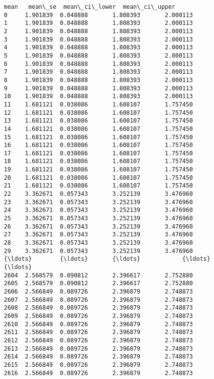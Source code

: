 \documentclass[11pt]{article}
\begin{document}
    \begin{Verbatim}[commandchars=\\\{\}]
          mean   mean\_se  mean\_ci\_lower  mean\_ci\_upper
0     1.901839  0.048888       1.808393       2.000113
1     1.901839  0.048888       1.808393       2.000113
2     1.901839  0.048888       1.808393       2.000113
3     1.901839  0.048888       1.808393       2.000113
4     1.901839  0.048888       1.808393       2.000113
5     1.901839  0.048888       1.808393       2.000113
6     1.901839  0.048888       1.808393       2.000113
7     1.901839  0.048888       1.808393       2.000113
8     1.901839  0.048888       1.808393       2.000113
9     1.901839  0.048888       1.808393       2.000113
10    1.901839  0.048888       1.808393       2.000113
11    1.681121  0.038086       1.608107       1.757450
12    1.681121  0.038086       1.608107       1.757450
13    1.681121  0.038086       1.608107       1.757450
14    1.681121  0.038086       1.608107       1.757450
15    1.681121  0.038086       1.608107       1.757450
16    1.681121  0.038086       1.608107       1.757450
17    1.681121  0.038086       1.608107       1.757450
18    1.681121  0.038086       1.608107       1.757450
19    1.681121  0.038086       1.608107       1.757450
20    1.681121  0.038086       1.608107       1.757450
21    1.681121  0.038086       1.608107       1.757450
22    3.362671  0.057343       3.252139       3.476960
23    3.362671  0.057343       3.252139       3.476960
24    3.362671  0.057343       3.252139       3.476960
25    3.362671  0.057343       3.252139       3.476960
26    3.362671  0.057343       3.252139       3.476960
27    3.362671  0.057343       3.252139       3.476960
28    3.362671  0.057343       3.252139       3.476960
29    3.362671  0.057343       3.252139       3.476960
{\ldots}        {\ldots}       {\ldots}            {\ldots}            {\ldots}
2604  2.568579  0.090812       2.396617       2.752880
2605  2.568579  0.090812       2.396617       2.752880
2606  2.566849  0.089726       2.396879       2.748873
2607  2.566849  0.089726       2.396879       2.748873
2608  2.566849  0.089726       2.396879       2.748873
2609  2.566849  0.089726       2.396879       2.748873
2610  2.566849  0.089726       2.396879       2.748873
2611  2.566849  0.089726       2.396879       2.748873
2612  2.566849  0.089726       2.396879       2.748873
2613  2.566849  0.089726       2.396879       2.748873
2614  2.566849  0.089726       2.396879       2.748873
2615  2.566849  0.089726       2.396879       2.748873
2616  2.566849  0.089726       2.396879       2.748873

\end{Verbatim}
\end{document}
